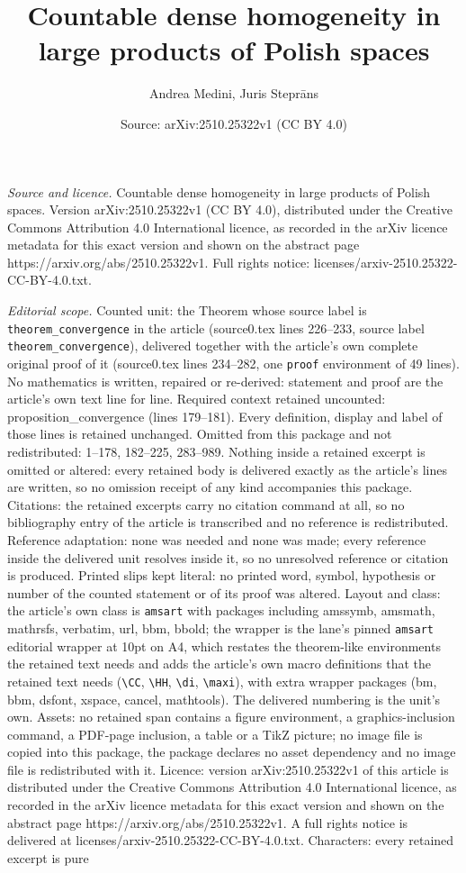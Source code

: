 \documentclass[10pt,a4paper]{amsart}
\title[Countable dense homogeneity in large products of Polish spac]{Countable dense homogeneity in large products of Polish spaces}
\author{Andrea Medini, Juris Stepr\=ans}
\date{Source: arXiv:2510.25322v1 (CC BY 4.0)}
\begin{document}
\maketitle

\noindent\emph{Source and licence.} Countable dense homogeneity in large products of Polish spaces. Version arXiv:2510.25322v1 (CC BY 4.0), distributed under the Creative Commons Attribution 4.0 International licence, as recorded in the arXiv licence metadata for this exact version and shown on the abstract page https://arxiv.org/abs/2510.25322v1. Full rights notice: licenses/arxiv-2510.25322-CC-BY-4.0.txt.\par\smallskip

\noindent\textit{Editorial scope.} Counted unit: the Theorem whose source label is \texttt{theorem\_convergence} in the article (source0.tex lines 226--233, source label \texttt{theorem\_convergence}), delivered together with the article's own complete original proof of it (source0.tex lines 234--282, one \texttt{proof} environment of 49 lines). No mathematics is written, repaired or re-derived: statement and proof are the article's own text line for line. Required context retained uncounted: proposition\_convergence (lines 179--181). Every definition, display and label of those lines is retained unchanged. Omitted from this package and not redistributed: 1--178, 182--225, 283--989. Nothing inside a retained excerpt is omitted or altered: every retained body is delivered exactly as the article's lines are written, so no omission receipt of any kind accompanies this package. Citations: the retained excerpts carry no citation command at all, so no bibliography entry of the article is transcribed and no reference is redistributed. Reference adaptation: none was needed and none was made; every reference inside the delivered unit resolves inside it, so no unresolved reference or citation is produced. Printed slips kept literal: no printed word, symbol, hypothesis or number of the counted statement or of its proof was altered. Layout and class: the article's own class is \texttt{amsart} with packages including amssymb, amsmath, mathrsfs, verbatim, url, bbm, bbold; the wrapper is the lane's pinned \texttt{amsart} editorial wrapper at 10pt on A4, which restates the theorem-like environments the retained text needs and adds the article's own macro definitions that the retained text needs (\texttt{\textbackslash CC}, \texttt{\textbackslash HH}, \texttt{\textbackslash di}, \texttt{\textbackslash maxi}), with extra wrapper packages (bm, bbm, dsfont, xspace, cancel, mathtools). The delivered numbering is the unit's own. Assets: no retained span contains a figure environment, a graphics-inclusion command, a PDF-page inclusion, a table or a TikZ picture; no image file is copied into this package, the package declares no asset dependency and no image file is redistributed with it. Licence: version arXiv:2510.25322v1 of this article is distributed under the Creative Commons Attribution 4.0 International licence, as recorded in the arXiv licence metadata for this exact version and shown on the abstract page https://arxiv.org/abs/2510.25322v1. A full rights notice is delivered at licenses/arxiv-2510.25322-CC-BY-4.0.txt. Characters: every retained excerpt is pure 
\end{document}
